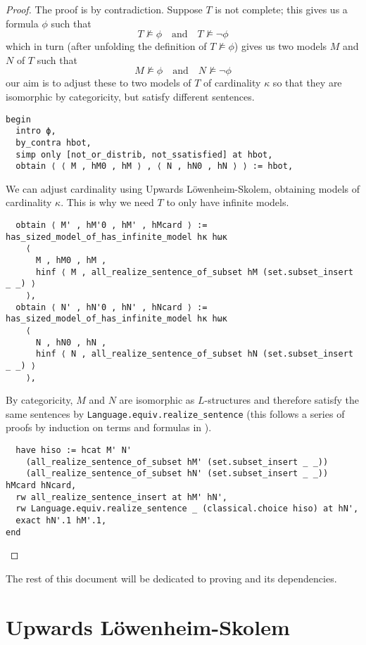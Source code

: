 \begin{proof}
The proof is by contradiction.
Suppose $T$ is not complete;
this gives us a formula $\phi$ such that
\[ T \nvDash \phi \quad \text{and} \quad T \nvDash \neg \phi \]
which in turn (after unfolding the definition of $T \nvDash \phi$)
gives us two models $M$ and $N$ of $T$ such that
\[ M \nvDash \phi \quad \text{and} \quad N \nvDash \neg \phi \]
our aim is to adjust these to two models of $T$
of cardinality $\kappa$ so that they are isomorphic by categoricity,
but satisfy different sentences.

\begin{lstlisting}
begin
  intro ϕ,
  by_contra hbot,
  simp only [not_or_distrib, not_ssatisfied] at hbot,
  obtain ⟨ ⟨ M , hM0 , hM ⟩ , ⟨ N , hN0 , hN ⟩ ⟩ := hbot,
\end{lstlisting}

We can adjust cardinality using Upwards L\"{o}wenheim-Skolem,
obtaining models of cardinality $\kappa$.
This is why we need $T$ to only have infinite models.
\begin{lstlisting}
  obtain ⟨ M' , hM'0 , hM' , hMcard ⟩ := has_sized_model_of_has_infinite_model hκ hωκ
    ⟨
      M , hM0 , hM ,
      hinf ⟨ M , all_realize_sentence_of_subset hM (set.subset_insert _ _) ⟩
    ⟩,
  obtain ⟨ N' , hN'0 , hN' , hNcard ⟩ := has_sized_model_of_has_infinite_model hκ hωκ
    ⟨
      N , hN0 , hN ,
      hinf ⟨ N , all_realize_sentence_of_subset hN (set.subset_insert _ _) ⟩
    ⟩, \end{lstlisting}

By categoricity, $M$ and $N$ are isomorphic as $L$-structures
and therefore satisfy the same sentences by
\texttt{Language.equiv.realize\_sentence}
(this follows a series of proofs by induction on terms and formulas in
).

\begin{lstlisting}
  have hiso := hcat M' N'
    (all_realize_sentence_of_subset hM' (set.subset_insert _ _))
    (all_realize_sentence_of_subset hN' (set.subset_insert _ _)) hMcard hNcard,
  rw all_realize_sentence_insert at hM' hN',
  rw Language.equiv.realize_sentence _ (classical.choice hiso) at hN',
  exact hN'.1 hM'.1,
end
\end{lstlisting}
\end{proof}

The rest of this document will be dedicated to proving
 and its dependencies.


\section{Upwards L\"{o}wenheim-Skolem}

